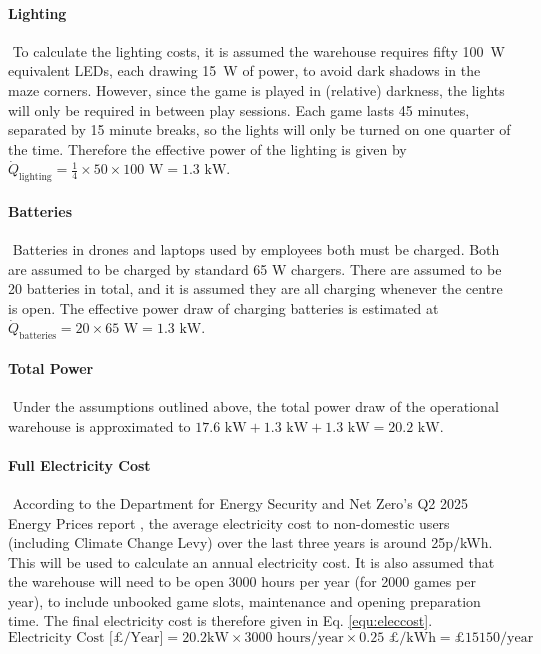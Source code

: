 \documentclass{report_template_oxford}
\begin{document}
\paragraph{Lighting} \(\) \newline
To calculate the lighting costs, it is assumed the warehouse requires fifty 100~W equivalent LEDs, each drawing 15~W of power, to avoid dark shadows in the maze corners. However, since the game is played in (relative) darkness, the lights will only be required in between play sessions. Each game lasts 45 minutes, separated by 15 minute breaks, so the lights will only be turned on one quarter of the time. Therefore the effective power of the lighting is given by \(\dot Q_\text{lighting} = \frac 14 \times 50\times100\text{ W} = 1.3\text{ kW}\).

\paragraph{Batteries} \(\) \newline
Batteries in drones and laptops used by employees both must be charged. Both are assumed to be charged by standard 65 W chargers. There are assumed to be 20 batteries in total, and it is assumed they are all charging whenever the centre is open. The effective power draw of charging batteries is estimated at \(\dot Q_\text{batteries}=20\times 65\text{ W}=1.3\text{ kW}\).

\paragraph{Total Power} \(\) \newline
Under the assumptions outlined above, the total power draw of the operational warehouse is approximated to \(17.6\text{ kW}+1.3\text{ kW}+1.3\text{ kW}=20.2\text{ kW}\).

\paragraph{Full Electricity Cost} \(\) \newline
According to the Department for Energy Security and Net Zero's Q2 2025 Energy Prices report \cite{EnergyPrices}, the average electricity cost to non-domestic users (including Climate Change Levy) over the last three years is around 25p/kWh. This will be used to calculate an annual electricity cost. It is also assumed that the warehouse will need to be open 3000 hours per year (for 2000 games per year), to include unbooked game slots, maintenance and opening preparation time. The final electricity cost is therefore given in Eq. \ref{equ:eleccost}.
\begin{equation}
    \label{equ:eleccost}
    \text{Electricity Cost [£/Year]}=20.2\text{kW}\times3000\text{ hours/year} \times 0.25 \text{ £/kWh}=£15150/\text{year}
\end{equation}
\end{document}

